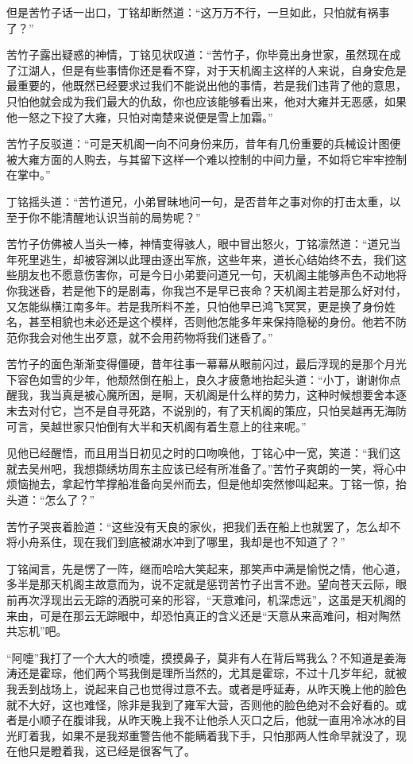 但是苦竹子话一出口，丁铭却断然道：“这万万不行，一旦如此，只怕就有祸事了？”

苦竹子露出疑惑的神情，丁铭见状叹道：“苦竹子，你毕竟出身世家，虽然现在成了江湖人，但是有些事情你还是看不穿，对于天机阁主这样的人来说，自身安危是最重要的，他既然已经要求过我们不能说出他的事情，若是我们违背了他的意思，只怕他就会成为我们最大的仇敌，你也应该能够看出来，他对大雍并无恶感，如果他一怒之下投了大雍，只怕对南楚来说便是雪上加霜。”

苦竹子反驳道：“可是天机阁一向不问身份来历，昔年有几份重要的兵械设计图便被大雍方面的人购去，与其留下这样一个难以控制的中间力量，不如将它牢牢控制在掌中。”

丁铭摇头道：“苦竹道兄，小弟冒昧地问一句，是否昔年之事对你的打击太重，以至于你不能清醒地认识当前的局势呢？”

苦竹子仿佛被人当头一棒，神情变得骇人，眼中冒出怒火，丁铭凛然道：“道兄当年死里逃生，却被容渊以此理由逐出军旅，这些年来，道长心结始终不去，我们这些朋友也不愿意伤害你，可是今日小弟要问道兄一句，天机阁主能够声色不动地将你我迷昏，若是他下的是剧毒，你我岂不是早已丧命？天机阁主若是那么好对付，又怎能纵横江南多年。若是我所料不差，只怕他早已鸿飞冥冥，更是换了身份姓名，甚至相貌也未必还是这个模样，否则他怎能多年来保持隐秘的身份。他若不防范你我会对他生出歹意，就不会用药物将我们迷昏了。”

苦竹子的面色渐渐变得僵硬，昔年往事一幕幕从眼前闪过，最后浮现的是那个月光下容色如雪的少年，他颓然倒在船上，良久才疲惫地抬起头道：“小丁，谢谢你点醒我，我当真是被心魔所困，是啊，天机阁是什么样的势力，这种时候想要舍本逐末去对付它，岂不是自寻死路，不说别的，有了天机阁的策应，只怕吴越再无海防可言，吴越世家只怕倒有大半和天机阁有着生意上的往来呢。”

见他已经醒悟，而且用当日初见之时的口吻唤他，丁铭心中一宽，笑道：“我们这就去吴州吧，我想撷绣坊周东主应该已经有所准备了。”苦竹子爽朗的一笑，将心中烦恼抛去，拿起竹竿撑船准备向吴州而去，但是他却突然惨叫起来。丁铭一惊，抬头道：“怎么了？”

苦竹子哭丧着脸道：“这些没有天良的家伙，把我们丢在船上也就罢了，怎么却不将小舟系住，现在我们到底被湖水冲到了哪里，我却是也不知道了？”

丁铭闻言，先是愣了一阵，继而哈哈大笑起来，那笑声中满是愉悦之情，他心道，多半是那天机阁主故意而为，说不定就是惩罚苦竹子出言不逊。望向苍天云际，眼前再次浮现出云无踪的洒脱可亲的形容，“天意难问，机深虑远”，这虽是天机阁的来由，可是在那云无踪眼中，却恐怕真正的含义还是“天意从来高难问，相对陶然共忘机”吧。

“阿嚏”我打了一个大大的喷嚏，摸摸鼻子，莫非有人在背后骂我么？不知道是姜海涛还是霍琮，他们两个骂我倒是理所当然的，尤其是霍琮，不过十几岁年纪，就被我丢到战场上，说起来自己也觉得过意不去。或者是呼延寿，从昨天晚上他的脸色就不大好，这也难怪，除非是我到了雍军大营，否则他的脸色绝对不会好看的。或者是小顺子在腹诽我，从昨天晚上我不让他杀人灭口之后，他就一直用冷冰冰的目光盯着我，如果不是我郑重警告他不能瞒着我下手，只怕那两人性命早就没了，现在他只是瞪着我，这已经是很客气了。

